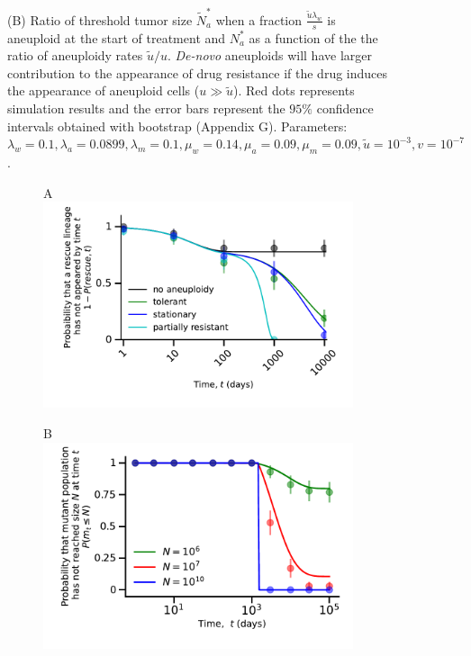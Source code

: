 \documentclass[12pt]{extarticle}
\begin{document}
\begin{figure}
{(B) Ratio of threshold tumor size $\tilde{N}_a^*$ when a fraction $\frac{\tilde{u}\lambda_w}{s}$ is aneuploid at the start of treatment and $N_a^*$ as a function of the the ratio of aneuploidy rates $\tilde{u}/u$. \emph{De-novo} aneuploids will have larger contribution to the appearance of drug resistance if the drug induces the appearance of aneuploid cells ($u \gg \tilde u$). Red dots represents  simulation results and the error bars represent the $95\%$ confidence intervals obtained with bootstrap (Appendix G). Parameters: $\lambda_w=0.1,\lambda_a=0.0899,\lambda_m=0.1,\mu_w=0.14,\mu_a=0.09,\mu_m=0.09,\tilde{u}=10^{-3}, v=10^{-7}$.
}
\label{rescue_denovo}
\end{figure}


\begin{figure}
\vspace*{1\baselineskip}
\begin{subfigure}{0.5\textwidth}
A\\
\includegraphics[width=1\textwidth]{Figures/ReboundProbability.pdf}
\end{subfigure}
\begin{subfigure}{0.5\textwidth}
B\\
\includegraphics[width=1\textwidth]{Figures/ProliferationTimeCDFN.pdf}

\end{subfigure}
\end{figure}
\end{document}
